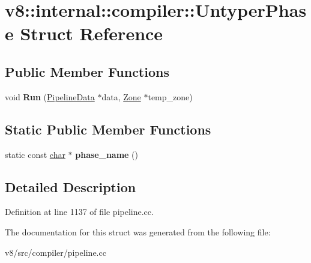 \hypertarget{structv8_1_1internal_1_1compiler_1_1UntyperPhase}{}\section{v8\+:\+:internal\+:\+:compiler\+:\+:Untyper\+Phase Struct Reference}
\label{structv8_1_1internal_1_1compiler_1_1UntyperPhase}
\subsection*{Public Member Functions}
\begin{DoxyCompactItemize}
\item 
\mbox{\label{structv8_1_1internal_1_1compiler_1_1UntyperPhase_a6a0f5437ac9e79e67b510285322e7337}} 
void {\bfseries Run} (\mbox{\hyperlink{classv8_1_1internal_1_1compiler_1_1PipelineData}{Pipeline\+Data}} $\ast$data, \mbox{\hyperlink{classv8_1_1internal_1_1Zone}{Zone}} $\ast$temp\+\_\+zone)
\end{DoxyCompactItemize}
\subsection*{Static Public Member Functions}
\begin{DoxyCompactItemize}
\item 
\mbox{\label{structv8_1_1internal_1_1compiler_1_1UntyperPhase_ab30ce8f537bde25340096c3306e2a4ab}} 
static const \mbox{\hyperlink{classchar}{char}} $\ast$ {\bfseries phase\+\_\+name} ()
\end{DoxyCompactItemize}


\subsection{Detailed Description}


Definition at line 1137 of file pipeline.\+cc.



The documentation for this struct was generated from the following file\+:\begin{DoxyCompactItemize}
\item 
v8/src/compiler/pipeline.\+cc\end{DoxyCompactItemize}
